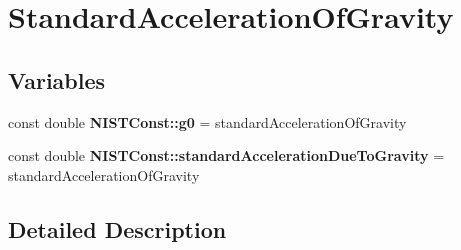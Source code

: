 \hypertarget{group___standard_acceleration_of_gravity}{}\section{Standard\+Acceleration\+Of\+Gravity}
\label{group___standard_acceleration_of_gravity}
\subsection*{Variables}
\begin{DoxyCompactItemize}
\item 
\mbox{\label{group___standard_acceleration_of_gravity_ga1fd0cec0a449e40eb603ac6292027924}} 
const double {\bfseries N\+I\+S\+T\+Const\+::g0} = standard\+Acceleration\+Of\+Gravity
\item 
\mbox{\label{group___standard_acceleration_of_gravity_ga7d417cb0027680e48ff481ab68a0864e}} 
const double {\bfseries N\+I\+S\+T\+Const\+::standard\+Acceleration\+Due\+To\+Gravity} = standard\+Acceleration\+Of\+Gravity
\end{DoxyCompactItemize}


\subsection{Detailed Description}
